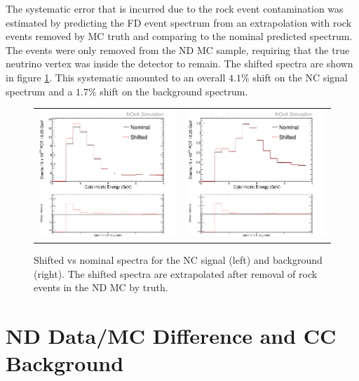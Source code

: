 The systematic error that is incurred due to the rock event contamination was estimated by predicting the FD event spectrum from an extrapolation with rock events removed by MC truth and comparing to the nominal predicted spectrum. The events were only removed from the ND MC sample, requiring that the true neutrino vertex was inside the detector to remain. The shifted spectra are shown in figure \ref{fig:SystNDRock}. This systematic amounted to an overall $4.1\%$ shift on the NC signal spectrum and a $1.7\%$ shift on the background spectrum.
\begin{figure}[htb]
  \centering
  \begin{tabular}{c c}
    \includegraphics[width=.47\textwidth]{figures/Systs/cNCEXNDRockSysts.png} &
    \includegraphics[width=.47\linewidth]{figures/Systs/cBGEXNDRockSysts.png} \\
  \end{tabular}
  \caption[ND Rock Contamination Shifted Spectra]{Shifted vs nominal spectra for the NC signal (left) and background (right). The shifted spectra are extrapolated after removal of rock events in the ND MC by truth.}
  \label{fig:SystNDRock}
\end{figure}

\section{ND Data/MC Difference and CC Background}
\label{sec:SystDataMC}

